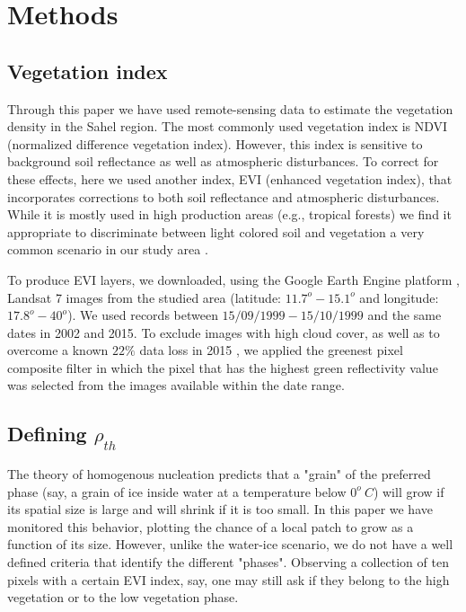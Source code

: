 \documentclass[aps,pre,twocolumn]{revtex4-1}
\begin{document}
\section{Methods}
\subsection{Vegetation index} Through this paper we have used remote-sensing data to estimate the vegetation density in the Sahel region.  The most commonly used vegetation index is  NDVI (normalized difference vegetation index). However, this index  is sensitive to background soil reflectance as well as atmospheric disturbances. To correct for these effects, here we used another index,  EVI (enhanced vegetation index), that incorporates  corrections to both soil reflectance and atmospheric disturbances. While it is mostly used in high production areas (e.g., tropical forests) we find it appropriate to discriminate between light colored soil and vegetation a very common scenario in our study area \cite{wallace2008estimation,huete2002overview}.

To produce EVI layers, we  downloaded, using the Google Earth Engine platform \cite{googleearthengine}, Landsat 7 images from the studied area (latitude: $11.7^o - 15.1^o$ and longitude: $17.8^o - 40^o$). We  used records between $15/09/1999-15/10/1999$ and the same dates in 2002 and 2015. To exclude images with high cloud cover, as well as to overcome a known $22\%$ data loss in 2015 \cite{landset}, we applied the greenest pixel composite filter \cite{shresthamulti} in which the pixel that has the highest green reflectivity value was selected from the images available within the date range.

\subsection{Defining $\rho_{th}$} The theory of homogenous nucleation predicts that a "grain" of the preferred phase (say, a grain of ice inside water at a temperature below $0^o \  C$) will grow if its spatial size is large and will shrink if it is too small. In this paper we have monitored this behavior, plotting the chance of a local patch to grow as a function of its size. However, unlike the water-ice scenario, we do not have a well defined criteria that identify the different "phases". Observing a collection of ten pixels with a certain EVI index, say, one may still ask if they belong to the high vegetation or to the low vegetation phase.
\end{document}
